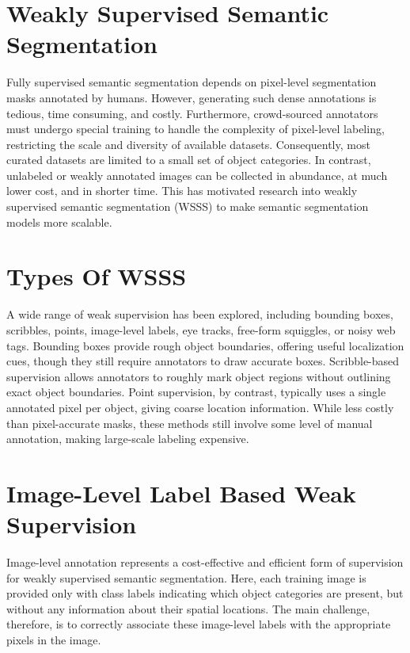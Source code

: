 \section{Weakly Supervised Semantic Segmentation}
\label{sec:weakly-supervised}
Fully supervised semantic segmentation depends on pixel-level segmentation masks annotated by humans. However, generating such dense annotations is tedious, time consuming, and costly. Furthermore, crowd-sourced annotators must undergo special training to handle the complexity of pixel-level labeling, restricting the scale and diversity of available datasets. Consequently, most curated datasets are limited to a small set of object categories. In contrast, unlabeled or weakly annotated images can be collected in abundance, at much lower cost, and in shorter time. This has motivated research into weakly supervised semantic segmentation (WSSS) to make semantic segmentation models more scalable.


\section{Types Of WSSS}
\label{sec:types-weakly-supervised}
A wide range of weak supervision has been explored, including bounding boxes, scribbles, points, image-level labels,  eye tracks, free-form squiggles, or noisy web tags. Bounding boxes provide rough object boundaries, offering useful localization cues, though they still require annotators to draw accurate boxes.  Scribble-based supervision allows annotators to roughly mark object regions without outlining exact object boundaries. Point supervision, by contrast, typically uses a single annotated pixel per object, giving coarse location information. While less costly than pixel-accurate masks, these methods still involve some level of manual annotation, making large-scale labeling expensive.


\section{Image-Level Label Based Weak Supervision}
\label{sec:image-level-label}
Image-level annotation represents a cost-effective and efficient form of supervision for weakly supervised semantic segmentation. Here, each training image is provided only with class labels indicating which object categories are present, but without any information about their spatial locations. The main challenge, therefore, is to correctly associate these image-level labels with the appropriate pixels in the image.


